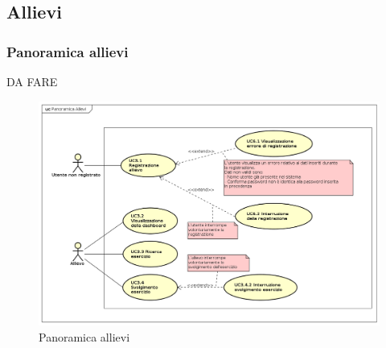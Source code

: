 \subsection{Allievi}
\subsubsection{Panoramica allievi}
DA FARE

\begin{figure}[H]
\centering
\includegraphics[width=17cm]{img/Panoramica Allievi.png} 
\caption{Panoramica allievi}\label{fig:31}
\end{figure}


